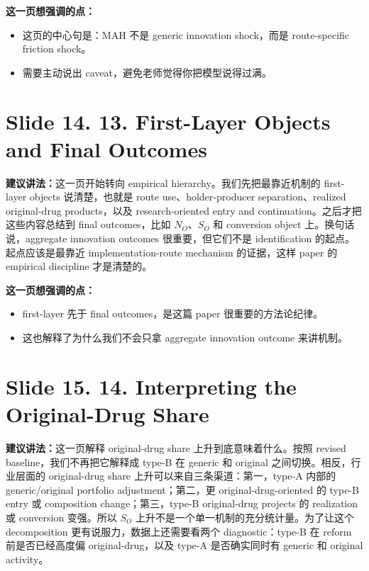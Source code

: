 \documentclass[12pt]{ctexart}
\begin{document}
\vspace{0.5em}
\textbf{这一页想强调的点：}
\begin{itemize}
\item 这页的中心句是：MAH 不是 generic innovation shock，而是 route-specific friction shock。
\item 需要主动说出 caveat，避免老师觉得你把模型说得过满。
\end{itemize}

\newpage
\section*{Slide 14. 13. First-Layer Objects and Final Outcomes}
\textbf{建议讲法：}这一页开始转向 empirical hierarchy。我们先把最靠近机制的 first-layer objects 说清楚，也就是 route use、holder-producer separation、realized original-drug products，以及 research-oriented entry and continuation。之后才把这些内容总结到 final outcomes，比如 $N_O$、$S_O$ 和 conversion object 上。换句话说，aggregate innovation outcomes 很重要，但它们不是 identification 的起点。起点应该是最靠近 implementation-route mechanism 的证据，这样 paper 的 empirical discipline 才是清楚的。

\vspace{0.5em}
\textbf{这一页想强调的点：}
\begin{itemize}
\item first-layer 先于 final outcomes，是这篇 paper 很重要的方法论纪律。
\item 这也解释了为什么我们不会只拿 aggregate innovation outcome 来讲机制。
\end{itemize}

\newpage
\section*{Slide 15. 14. Interpreting the Original-Drug Share}
\textbf{建议讲法：}这一页解释 original-drug share 上升到底意味着什么。按照 revised baseline，我们不再把它解释成 type-B 在 generic 和 original 之间切换。相反，行业层面的 original-drug share 上升可以来自三条渠道：第一，type-A 内部的 generic/original portfolio adjustment；第二，更 original-drug-oriented 的 type-B entry 或 composition change；第三，type-B original-drug projects 的 realization 或 conversion 变强。所以 $S_O$ 上升不是一个单一机制的充分统计量。为了让这个 decomposition 更有说服力，数据上还需要看两个 diagnostic：type-B 在 reform 前是否已经高度偏 original-drug，以及 type-A 是否确实同时有 generic 和 original activity。
\end{document}
